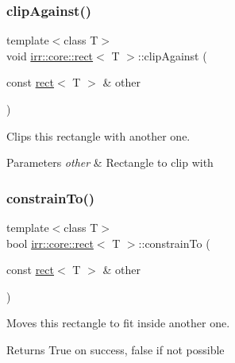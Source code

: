 \subsubsection{\texorpdfstring{clip\+Against()}{clipAgainst()}}
{\footnotesize\ttfamily template$<$class T$>$ \\
void \hyperlink{classirr_1_1core_1_1rect}{irr\+::core\+::rect}$<$ T $>$\+::clip\+Against (\begin{DoxyParamCaption}\item[{const \hyperlink{classirr_1_1core_1_1rect}{rect}$<$ T $>$ \&}]{other }\end{DoxyParamCaption})\hspace{0.3cm}{\ttfamily [inline]}}



Clips this rectangle with another one. 


\begin{DoxyParams}{Parameters}
{\em other} & Rectangle to clip with \\
\hline
\end{DoxyParams}
\mbox{\label{classirr_1_1core_1_1rect_a4515d2a1349dc805775854a422465f63}} 
\subsubsection{\texorpdfstring{constrain\+To()}{constrainTo()}}
{\footnotesize\ttfamily template$<$class T$>$ \\
bool \hyperlink{classirr_1_1core_1_1rect}{irr\+::core\+::rect}$<$ T $>$\+::constrain\+To (\begin{DoxyParamCaption}\item[{const \hyperlink{classirr_1_1core_1_1rect}{rect}$<$ T $>$ \&}]{other }\end{DoxyParamCaption})\hspace{0.3cm}{\ttfamily [inline]}}



Moves this rectangle to fit inside another one. 

\begin{DoxyReturn}{Returns}
True on success, false if not possible 
\end{DoxyReturn}
\mbox{\label{classirr_1_1core_1_1rect_a34c84ad8ff423a4b657eedbcd112afb3}} 
